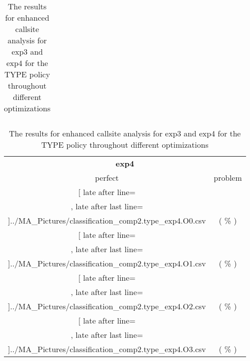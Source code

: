 \begin{table}[!htbp]
{\begin{tabular}{l|c|c|c}
    	\end{tabular}

	\begin{tabular}{|c|c}%

	\toprule
	\multicolumn{2}{c}{\bfseries  exp4}\\
	
	perfect &  problem %
	\\\midrule
	\csvreader[ late after line=\\, late after last line=\\\midrule]{../MA_Pictures/classification_comp2.type_exp4.O0.csv}{
}
	{\csvcoliv ( \csvcolv \% ) & \csvcolvi( \csvcolvii\% )}%



\multicolumn{1}{c}{} 
	\\\midrule
	\csvreader[ late after line=\\, late after last line=\\\midrule]{../MA_Pictures/classification_comp2.type_exp4.O1.csv}{
}
	{\csvcoliv ( \csvcolv \% ) & \csvcolvi( \csvcolvii\% )}%
	
	
\multicolumn{1}{c}{}
	\\\midrule
	\csvreader[ late after line=\\, late after last line=\\\midrule]{../MA_Pictures/classification_comp2.type_exp4.O2.csv}{
}
	{\csvcoliv ( \csvcolv \% ) & \csvcolvi( \csvcolvii\% )}%
	

\multicolumn{1}{c}{}
	\\\midrule
	\csvreader[ late after line=\\, late after last line=\\\bottomrule]{../MA_Pictures/classification_comp2.type_exp4.O3.csv}{
}
	{\csvcoliv ( \csvcolv \% ) & \csvcolvi( \csvcolvii\% )}%


    	\end{tabular}
}
		\caption {The results for enhanced callsite analysis for exp3 and exp4 for the TYPE policy throughout different optimizations}
		\label{tbl:CSexp34TYPE}
\end{table}
\newpage
\newpage

